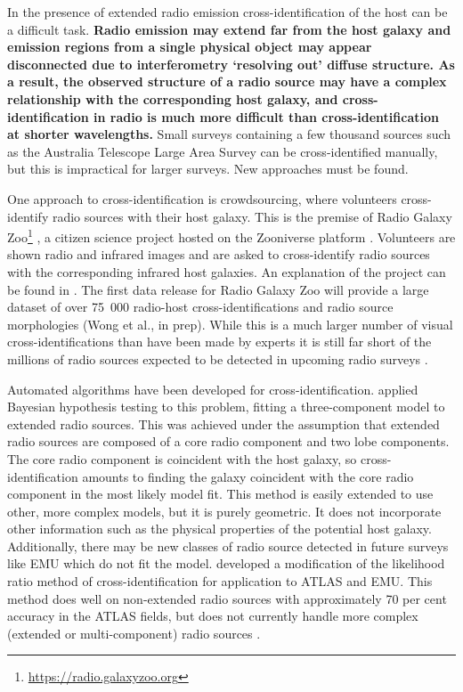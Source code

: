 \documentclass[fleqn,usenatbib,usedcolumn]{mnras}
\newcommand{\edited}[1]{{\bf {#1}}}
\begin{document}
  In the presence of extended radio emission cross-identification of the host can be a
  difficult task. \edited{Radio emission may extend far from the host galaxy
  and emission regions from a single physical object may appear disconnected
  due to interferometry `resolving out' diffuse structure. As a result, the
  observed structure of a radio source may have a complex relationship
  with the corresponding host galaxy, and cross-identification in radio is
  much more difficult than cross-identification at shorter wavelengths.} Small surveys
  containing a few thousand sources such as the Australia Telescope Large Area Survey
  \citep[ATLAS;][]{norris06, middelberg08} can be cross-identified manually,
  but this is impractical for larger surveys. New approaches must be found.

  One approach to cross-identification is crowdsourcing, where volunteers
  cross-identify radio sources with their host galaxy. This is the premise of Radio Galaxy
  Zoo\footnote{\url{https://radio.galaxyzoo.org}} \citep{banfield15}, a
  citizen science project hosted on the Zooniverse platform \citep{lintott08}.
  Volunteers are shown radio and infrared images and are asked to
  cross-identify radio sources with the corresponding infrared host galaxies. An
  explanation of the project can be found in \citet{banfield15}. The first
  data release for Radio Galaxy Zoo will provide a large dataset of over
  75~000 radio-host cross-identifications and radio source morphologies
  (Wong et al., in prep). While this is a much larger number of visual
  cross-identifications than have been made by experts \citep[e.g.,
  ][]{Taylor2007,Gendre2008,Grant2010,norris06,middelberg08} it is still far
  short of the millions of radio sources expected to be detected in upcoming
  radio surveys \citep{norris17surveys}.

  Automated algorithms have been developed for cross-identification.
  \citet{fan15} applied Bayesian
  hypothesis testing to this problem, fitting a three-component model to extended radio
  sources. This was achieved under the assumption that extended radio sources
  are composed of a core radio component and two lobe components. The core
  radio component is coincident with the host galaxy, so cross-identification
  amounts to finding the galaxy coincident with the core radio component in
  the most likely model fit. This method is easily extended to use other, more
  complex models, but it is purely geometric. It does not incorporate
  other information such as the physical properties of the potential host
  galaxy. Additionally, there may be new classes of radio source detected in
  future surveys like EMU which do not fit the model. \citet{weston18lrpy}
  developed a modification of the likelihood ratio method of
  cross-identification \citep{richter75likelihood} for application to ATLAS
  and EMU. This method does well on non-extended radio sources
  with approximately 70 per cent accuracy in the ATLAS fields, but does
  not currently handle more complex (extended or multi-component) radio sources
  \citep{norris17unexpected}.
\end{document}
